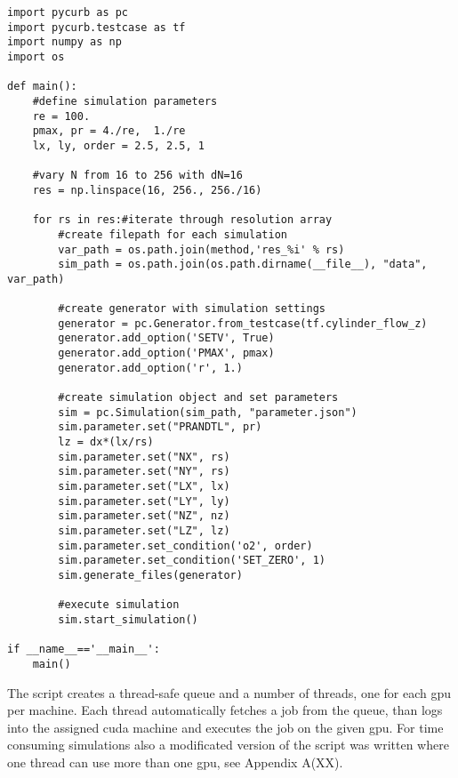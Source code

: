 \begin{minipage}{\linewidth}
\begin{lstlisting}[caption='Grid Convergence Study Example']
import pycurb as pc
import pycurb.testcase as tf
import numpy as np
import os

def main():
    #define simulation parameters
    re = 100.
    pmax, pr = 4./re,  1./re
    lx, ly, order = 2.5, 2.5, 1

    #vary N from 16 to 256 with dN=16
    res = np.linspace(16, 256., 256./16)

    for rs in res:#iterate through resolution array
        #create filepath for each simulation
        var_path = os.path.join(method,'res_%i' % rs)
        sim_path = os.path.join(os.path.dirname(__file__), "data", var_path)

        #create generator with simulation settings
        generator = pc.Generator.from_testcase(tf.cylinder_flow_z)
        generator.add_option('SETV', True)
        generator.add_option('PMAX', pmax)
        generator.add_option('r', 1.)

        #create simulation object and set parameters
        sim = pc.Simulation(sim_path, "parameter.json")
        sim.parameter.set("PRANDTL", pr)
        lz = dx*(lx/rs)
        sim.parameter.set("NX", rs)
        sim.parameter.set("NY", rs)
        sim.parameter.set("LX", lx)
        sim.parameter.set("LY", ly)
        sim.parameter.set("NZ", nz)
        sim.parameter.set("LZ", lz)
        sim.parameter.set_condition('o2', order)
        sim.parameter.set_condition('SET_ZERO', 1)
        sim.generate_files(generator)

        #execute simulation
        sim.start_simulation()

if __name__=='__main__':
    main()
\end{lstlisting}
\end{minipage}
\clearpage

The script creates a thread-safe queue and a number of threads, one for each gpu per machine.
Each thread automatically fetches a job from the queue, than logs into the assigned cuda machine
and executes the job on the given gpu.
For time consuming simulations also a modificated version of the script was written where one thread
can use more than one gpu, see Appendix A(XX).
